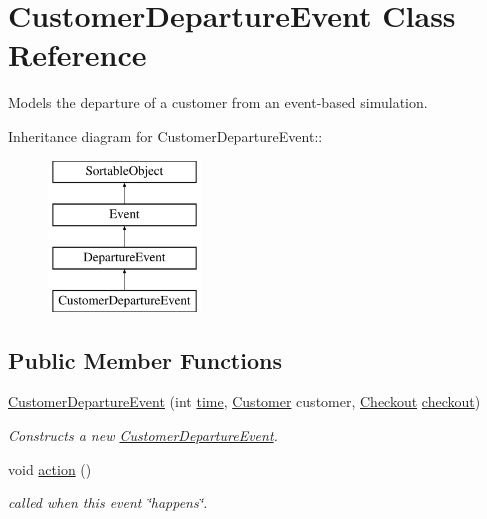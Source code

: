 \hypertarget{class_customer_departure_event}{
\section{CustomerDepartureEvent Class Reference}
\label{class_customer_departure_event}
}
Models the departure of a customer from an event-based simulation.  


Inheritance diagram for CustomerDepartureEvent::\begin{figure}[H]
\begin{center}
\leavevmode
\includegraphics[height=4cm]{class_customer_departure_event}
\end{center}
\end{figure}
\subsection*{Public Member Functions}
\begin{CompactItemize}
\item 
\hyperlink{class_customer_departure_event_64ebee80dee23f6c0ca66fee9c514546}{CustomerDepartureEvent} (int \hyperlink{class_event_d4c0fbb00c3fd993405df98bafcd52c5}{time}, \hyperlink{class_customer}{Customer} customer, \hyperlink{class_checkout}{Checkout} \hyperlink{class_departure_event_2fac3154bc1da1ab0a32c457872451a1}{checkout})
\begin{CompactList}\small\item\em Constructs a new \hyperlink{class_customer_departure_event}{CustomerDepartureEvent}. \item\end{CompactList}\item 
void \hyperlink{class_customer_departure_event_0245be14abc9118d39123158559e1cdb}{action} ()
\begin{CompactList}\small\item\em called when this event \char`\"{}happens\char`\"{}. \item\end{CompactList}\end{CompactItemize}


